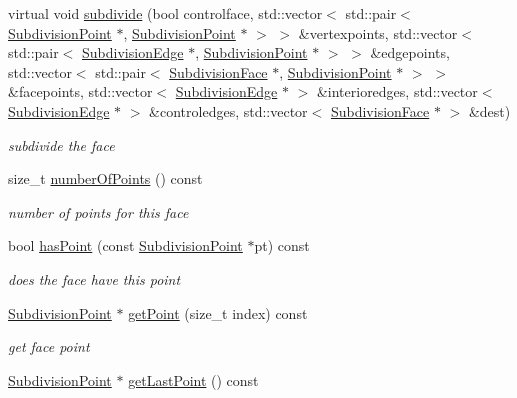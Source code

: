 \begin{DoxyCompactItemize}
virtual void \hyperlink{classShipCAD_1_1SubdivisionFace_a934edbf44e524a2ec250f896c3cc182d}{subdivide} (bool controlface, std\+::vector$<$ std\+::pair$<$ \hyperlink{classShipCAD_1_1SubdivisionPoint}{Subdivision\+Point} $\ast$, \hyperlink{classShipCAD_1_1SubdivisionPoint}{Subdivision\+Point} $\ast$ $>$ $>$ \&vertexpoints, std\+::vector$<$ std\+::pair$<$ \hyperlink{classShipCAD_1_1SubdivisionEdge}{Subdivision\+Edge} $\ast$, \hyperlink{classShipCAD_1_1SubdivisionPoint}{Subdivision\+Point} $\ast$ $>$ $>$ \&edgepoints, std\+::vector$<$ std\+::pair$<$ \hyperlink{classShipCAD_1_1SubdivisionFace}{Subdivision\+Face} $\ast$, \hyperlink{classShipCAD_1_1SubdivisionPoint}{Subdivision\+Point} $\ast$ $>$ $>$ \&facepoints, std\+::vector$<$ \hyperlink{classShipCAD_1_1SubdivisionEdge}{Subdivision\+Edge} $\ast$ $>$ \&interioredges, std\+::vector$<$ \hyperlink{classShipCAD_1_1SubdivisionEdge}{Subdivision\+Edge} $\ast$ $>$ \&controledges, std\+::vector$<$ \hyperlink{classShipCAD_1_1SubdivisionFace}{Subdivision\+Face} $\ast$ $>$ \&dest)
\begin{DoxyCompactList}\small\item\em subdivide the face \end{DoxyCompactList}\item 
size\+\_\+t \hyperlink{classShipCAD_1_1SubdivisionFace_abd79b6dfadd10befe94b524a34063b27}{number\+Of\+Points} () const 
\begin{DoxyCompactList}\small\item\em number of points for this face \end{DoxyCompactList}\item 
bool \hyperlink{classShipCAD_1_1SubdivisionFace_a02d048ba8de79787bc692e5f20fd276e}{has\+Point} (const \hyperlink{classShipCAD_1_1SubdivisionPoint}{Subdivision\+Point} $\ast$pt) const 
\begin{DoxyCompactList}\small\item\em does the face have this point \end{DoxyCompactList}\item 
\hyperlink{classShipCAD_1_1SubdivisionPoint}{Subdivision\+Point} $\ast$ \hyperlink{classShipCAD_1_1SubdivisionFace_a68bc7676c4f254ddb19e04f8cb5ba76f}{get\+Point} (size\+\_\+t index) const 
\begin{DoxyCompactList}\small\item\em get face point \end{DoxyCompactList}\item 
\hyperlink{classShipCAD_1_1SubdivisionPoint}{Subdivision\+Point} $\ast$ \hyperlink{classShipCAD_1_1SubdivisionFace_a5da55a479cd54b90fc0ec5d0bedb9279}{get\+Last\+Point} () const 

\end{DoxyCompactItemize}

